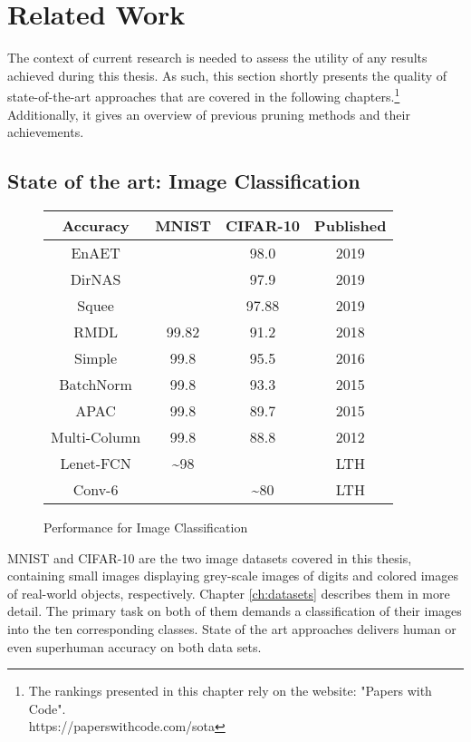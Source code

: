 \chapter{Related Work}
\label{ch:relatedwork}
 The context of current research is needed to assess the utility of any results achieved during this thesis. As such, this section shortly presents the quality of state-of-the-art approaches that are covered in the following chapters.\footnote{The rankings presented in this chapter rely on the website: "Papers with Code".\\
 	https://paperswithcode.com/sota
 } Additionally, it gives an overview of previous pruning methods and their achievements. 

\section{State of the art: Image Classification}
\begin{figure}
	\begin{tabular}{c|c|c|c}
		Accuracy & MNIST & CIFAR-10 & Published\\
		\hline
		EnAET &  & 98.0 & 2019 \\
		DirNAS &  & 97.9 & 2019 \\
		Squee &  & 97.88 & 2019 \\
		RMDL & 99.82 & 91.2 & 2018 \\
		Simple & 99.8 & 95.5 & 2016 \\
		BatchNorm  & 99.8 & 93.3 & 2015 \\
		APAC & 99.8 & 89.7 & 2015\\
		Multi-Column & 99.8 & 88.8 & 2012 \\
		\hline
		Lenet-FCN & \textasciitilde98 &  & LTH \\
		Conv-6 &  & \textasciitilde80 & LTH \\
		
	\end{tabular}
	\caption{Performance for Image Classification}
\end{figure}
MNIST and CIFAR-10 are the two image datasets covered in this thesis, containing small images displaying grey-scale images of digits and colored images of real-world objects, respectively. Chapter \ref{ch:datasets} describes them in more detail.
The primary task on both of them demands a classification of their images into the ten corresponding classes. State of the art approaches delivers human or even superhuman accuracy on both data sets.\\
